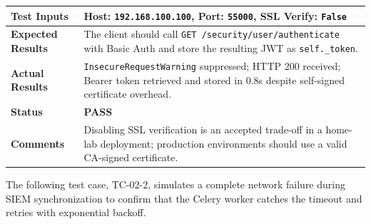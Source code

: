 \begin{table}[H]
{\begin{tabular}{|>{\raggedright\arraybackslash\bfseries}p{4.5cm}|>{\raggedright\arraybackslash}p{11.5cm}|}
        Test Inputs & Host: \texttt{192.168.100.100}, Port: \texttt{55000}, SSL Verify: \texttt{False} \\ \hline
        Expected Results & The client should call \texttt{GET /security/user/authenticate} with Basic Auth and store the resulting JWT as \texttt{self.\_token}. \\ \hline
        Actual Results & \texttt{InsecureRequestWarning} suppressed; HTTP 200 received; Bearer token retrieved and stored in 0.8s despite self-signed certificate overhead. \\ \hline
        Status & \textcolor{green!60!black}{\textbf{PASS}} \\ \hline
        Comments & Disabling SSL verification is an accepted trade-off in a home-lab deployment; production environments should use a valid CA-signed certificate. \\ \hline
    \end{tabular}
    }
\end{table}

The following test case, TC-02-2, simulates a complete network failure during SIEM synchronization to confirm that the Celery worker catches the timeout and retries with exponential backoff.

